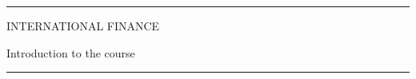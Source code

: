 \documentclass[12pt,aspectratio=169]{beamer}
\begin{document}
\begin{frame}
\unitlength 5mm

\begin{center}

\rule{\textwidth}{2pt}

\vskip3mm
INTERNATIONAL FINANCE

Introduction to the course
\rule{\textwidth}{2pt}

\end{center}

\end{frame}


\end{document}
